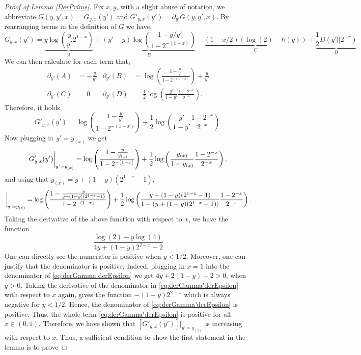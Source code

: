 \documentclass[12pt,reqno]{amsart}
\numberwithin{equation}{section}
\theoremstyle{definition}
\newcommand{\gl}{y + (1-y)(2^{1-x} - 1)}
\renewcommand{\[}{\begin{equation}}
\renewcommand{\]}{\end{equation}}
\renewcommand{\|}{\bigg{|}}
\begin{document}
\begin{proof}[Proof of Lemma \ref{DerPrime}]
    
    Fix $x,y$, with a slight abuse of notation, we abbreviate $G(y, y', x) = G_{y,x}(y')$ and $G'_{y,x}(y') = \partial_{y'}G(y, y', x)$. By rearranging terms in the definition of $G$ we have,
    \[
        G_{y,x}(y') = \underbrace{y \log\left(\frac{y}{y'} 2^{1-x}\right)}_{A} + \underbrace{(y' - y)\log\left(\frac{1-y/y'}{1-2^{-(1-x)}}\right)}_{B} - \underbrace{(1-x/2)(\log(2) - h(y))}_{C}+ \underbrace{\frac{1}{2}D(y'||2^{-x})}_{D}
    \]
    We can then calculate for each term that,
    \begin{align}
    \partial_{y'}(A) &= - \frac{y}{y'}&
    \partial_{y '}(B) &= \log\left( \frac{1-\frac{y}{y'}}{1-2^{-(1-x)}}\right) + \frac{y}{y'}\\
    \partial_{y'}(C) &= 0&
    \partial_{y'}(D) &= \frac{1}{2}\log\left(\frac{y'}{1-y'}\frac{1-2^{-x}}{2^{-x}}\right).
    \end{align}
    Therefore, it holds,
    \[G'_{y,x}(y') = \log\left( \frac{1-\frac{y}{y'}}{1-2^{-(1-x)}}\right) + \frac{1}{2}\log\left(\frac{y'}{1-y'}\frac{1-2^{-x}}{2^{-x}}\right).\]
    Now plugging in $y' = y_{(x)}$ we get
    \[G'_{y,x}(y')\bigg{|}_{y' = y_{(x)}} = \log\left( \frac{1-\frac{y}{y_{(x)}}}{1-2^{-(1-x)}}\right) + \frac{1}{2}\log\left(\frac{y_{(x)}}{1-y_{(x)}}\frac{1-2^{-x}}{2^{-x}}\right),\label{eq:gamma':der}\]
    and using that $y_{(x)} = y + (1-y)(2^{1-x} - 1)$,
    \[[G'_{y,x}(y')]\bigg{|}_{y' = y_{(x)}} = \log\left( \frac{1-\frac{y}{\gl}}{1-2^{-(1-x)}}\right) + \frac{1}{2}\log\left(\frac{\gl}{1-(\gl)}\frac{1-2^{-x}}{2^{-x}}\right).\]
    Taking the derivative of the above function with respect to $x$, we have the function
    \[\frac{\log(2) - y \log(4)}{4y + (1-y)2^{2-x} - 2}\label{eq:derGamma'derEpsilon}\]
    One can directly see the numerator is positive when $y < 1/2$. Moreover, one can justify that the denominator is positive. Indeed, plugging in $x = 1$ into the denominator of \eqref{eq:derGamma'derEpsilon} we get $4y + 2(1-y) - 2 > 0$,
    when $y > 0$. Taking the derivative of the denominator in \eqref{eq:derGamma'derEpsilon} with respect to $x$ again, gives the function $-(1-y)2^{2-x}$ which is always negative for $y < 1/2$. Hence, the denominator of \eqref{eq:derGamma'derEpsilon} is positive. Thus, the whole term \eqref{eq:derGamma'derEpsilon} is positive for all $x \in (0,1)$. Therefore, we have shown that $[G'_{y,x}(y')]|_{y' = y_{(x)}}$ is increasing with respect to $x$. Thus, a sufficient condition to show the first statement in the lemma is to prove

\end{proof}
\end{document}
